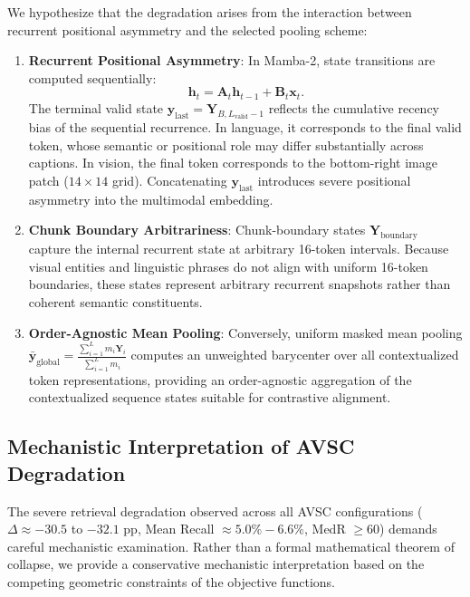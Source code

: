 \documentclass[conference]{IEEEtran}
\begin{document}
We hypothesize that the degradation arises from the interaction between recurrent positional asymmetry and the selected pooling scheme:
\begin{enumerate}
    \item \textbf{Recurrent Positional Asymmetry}: In Mamba-2, state transitions are computed sequentially:
    \begin{equation}
    \label{eq:mamba_recurrence}
    \mathbf{h}_t = \mathbf{A}_t \mathbf{h}_{t-1} + \mathbf{B}_t \mathbf{x}_t.
    \end{equation}
    The terminal valid state $\mathbf{y}_{\mathrm{last}} = \mathbf{Y}_{B, L_{\mathrm{valid}}-1}$ reflects the cumulative recency bias of the sequential recurrence. In language, it corresponds to the final valid token, whose semantic or positional role may differ substantially across captions. In vision, the final token corresponds to the bottom-right image patch ($14 \times 14$ grid). Concatenating $\mathbf{y}_{\mathrm{last}}$ introduces severe positional asymmetry into the multimodal embedding.
    \item \textbf{Chunk Boundary Arbitrariness}: Chunk-boundary states $\mathbf{Y}_{\mathrm{boundary}}$ capture the internal recurrent state at arbitrary 16-token intervals. Because visual entities and linguistic phrases do not align with uniform 16-token boundaries, these states represent arbitrary recurrent snapshots rather than coherent semantic constituents.
    \item \textbf{Order-Agnostic Mean Pooling}: Conversely, uniform masked mean pooling $\bar{\mathbf{y}}_{\mathrm{global}} = \frac{\sum_{i=1}^L m_i \mathbf{Y}_i}{\sum_{i=1}^L m_i}$ computes an unweighted barycenter over all contextualized token representations, providing an order-agnostic aggregation of the contextualized sequence states suitable for contrastive alignment.
\end{enumerate}

\subsection{Mechanistic Interpretation of AVSC Degradation}
\label{sec:avsc_mechanisms}
The severe retrieval degradation observed across all AVSC configurations ($\Delta \approx -30.5$ to $-32.1$ pp, Mean Recall $\approx 5.0\%-6.6\%$, MedR $\ge 60$) demands careful mechanistic examination. Rather than a formal mathematical theorem of collapse, we provide a conservative mechanistic interpretation based on the competing geometric constraints of the objective functions.
\end{document}

